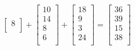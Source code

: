 \begin{eks}
\begin{center}
$$\begin{bmatrix}
8\\
\end{bmatrix}
+
\begin{bmatrix}
10\\
14\\
8\\
6\\
\end{bmatrix}
+
\begin{bmatrix}
18\\
9\\
3\\
24\\
\end{bmatrix}
=
\begin{bmatrix}
36\\
39\\
15\\
38\\
\end{bmatrix}
$$
\end{center}
\end{eks}
 

